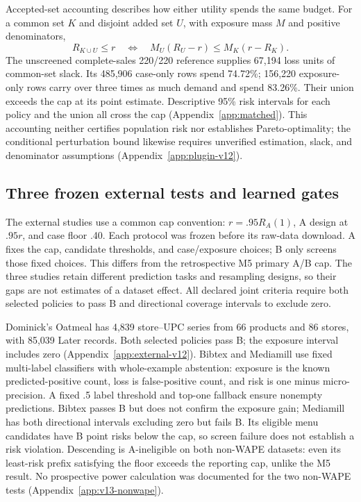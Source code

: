 \documentclass{article}
\begin{document}
Accepted-set accounting describes how either utility spends the same budget. For a common set $K$ and disjoint added set $U$, with exposure mass $M$ and positive denominators,
\begin{equation}
 R_{K\cup U}\leq r \quad\Longleftrightarrow\quad M_U(R_U-r)\leq M_K(r-R_K).
 \label{eq:budget}
\end{equation}
The unscreened complete-sales 220/220 reference supplies 67,194 loss units of common-set slack. Its 485,906 case-only rows spend 74.72\%; 156,220 exposure-only rows carry over three times as much demand and spend 83.26\%. Their union exceeds the cap at its point estimate. Descriptive 95\% risk intervals for each policy and the union all cross the cap (Appendix~\ref{app:matched}). This accounting neither certifies population risk nor establishes Pareto-optimality; the conditional perturbation bound likewise requires unverified estimation, slack, and denominator assumptions (Appendix~\ref{app:plugin-v12}).

\subsection{Three frozen external tests and learned gates}
\label{sec:external-v12}\label{sec:external-v13}
The external studies use a common cap convention: $r=.95R_A(1)$, A design at $.95r$, and case floor .40. Each protocol was frozen before its raw-data download. A fixes the cap, candidate thresholds, and case/exposure choices; B only screens those fixed choices. This differs from the retrospective M5 primary A/B cap. The three studies retain different prediction tasks and resampling designs, so their gaps are not estimates of a dataset effect. All declared joint criteria require both selected policies to pass B and directional coverage intervals to exclude zero.



Dominick's Oatmeal \citep{kiltsdominicks} has 4,839 store--UPC series from 66 products and 86 stores, with 85,039 Later records. Both selected policies pass B; the exposure interval includes zero (Appendix~\ref{app:external-v12}). Bibtex and Mediamill use fixed multi-label classifiers with whole-example abstention: exposure is the known predicted-positive count, loss is false-positive count, and risk is one minus micro-precision. A fixed .5 label threshold and top-one fallback ensure nonempty predictions. Bibtex passes B but does not confirm the exposure gain; Mediamill has both directional intervals excluding zero but fails B. Its eligible menu candidates have B point risks below the cap, so screen failure does not establish a risk violation. Descending is A-ineligible on both non-WAPE datasets: even its least-risk prefix satisfying the floor exceeds the reporting cap, unlike the M5 result. No prospective power calculation was documented for the two non-WAPE tests (Appendix~\ref{app:v13-nonwape}).
\end{document}
